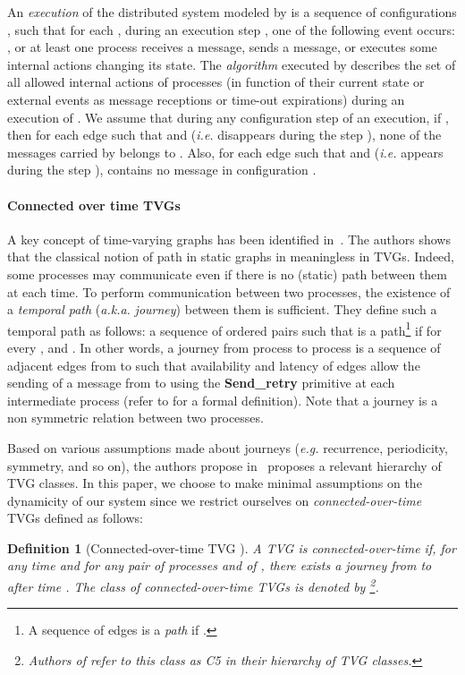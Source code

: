 \documentclass{article}
\newtheorem{definition}{Definition}
\begin{document}
An {\em execution} of the distributed system modeled by  is a sequence of configurations  , such that for each , during an execution step , one of the following event occurs:  , or  at least one process receives a message, sends a message, or executes some internal actions changing its state. The \emph{algorithm} executed by  describes the set of all allowed internal actions of processes (in function of their current state or external events as message receptions or time-out expirations) during an execution of . We assume that during any configuration step  of an execution, if  , then for each edge  such that   and  (\emph{i.e.}  disappears during the step ), none of the messages carried by  belongs to . Also, for each edge  such that   and  (\emph{i.e.}  appears during the step ),  contains no message in configuration . 

\paragraph{Connected over time TVGs} A key concept of time-varying graphs has been identified in~\cite{CFQS12}. The authors shows that the classical notion of path in static graphs in meaningless in TVGs. Indeed, some processes may communicate even if there is no (static) path between them at each time. To perform communication between two processes, the existence of a \emph{temporal path} (\emph{a.k.a.} \emph{journey}) between them is sufficient.  They define such a temporal path as follows: a sequence of ordered pairs  such that   is a path\footnote{A sequence of edges  is a \emph{path} if  .} if for every ,  and . In other words, a journey from process  to process  is a sequence of adjacent edges from  to  such that availability and latency of edges allow the sending of a message from  to  using the \textbf{Send\_retry} primitive at each intermediate process (refer to \cite{CFQS12} for a formal definition). Note that a journey is a non symmetric relation between two processes.

Based on various assumptions made about journeys (\emph{e.g.} recurrence, periodicity, symmetry, and so on), the authors propose in~\cite{CFQS12} proposes a relevant hierarchy of TVG classes. In this paper, we choose to make minimal assumptions on the dynamicity of our system since we restrict ourselves on \emph{connected-over-time} TVGs defined as follows: 

\begin{definition}[Connected-over-time TVG \cite{CFQS12}]\label{def:COT}
A TVG  is connected-over-time if, for any time  and for any pair of processes  and  of , there exists a journey from  to  after time . The class of connected-over-time TVGs is denoted by \footnote{Authors of \cite{CFQS12} refer to this class as C5 in their hierarchy of TVG classes.}.
\end{definition}
\end{document}
